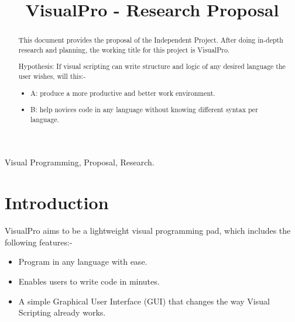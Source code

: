 \documentclass[conference]{IEEEtran}
\begin{document}
	\title{VisualPro - Research Proposal}

	\author{
	}

     \maketitle
    
    \thispagestyle{plain}
    \pagestyle{plain}
    
    \tableofcontents

    \begin{abstract}
    \label{abstract}
      This document provides the proposal of the Independent Project. After doing in-depth research and planning, the working title for this project is VisualPro.

      Hypothesis: If visual scripting can write structure and logic of any desired language the user wishes, will this:-
        \begin{itemize}
          \item A: produce a more productive and better work environment.
          \item B: help novices code in any language without knowing different syntax per language.
        \end{itemize}
    \end{abstract}

    \begin{IEEEkeywords}
        Visual Programming, Proposal, Research.
    \end{IEEEkeywords}
  
    \section{Introduction}
      VisualPro aims to be a lightweight visual programming pad, which includes the following features:-
      \begin{itemize}
        \item Program in any language with ease.
        \item Enables users to write code in minutes.
        \item A simple Graphical User Interface (GUI) that changes the way Visual Scripting already works.
      \end{itemize}
  
\end{document}
